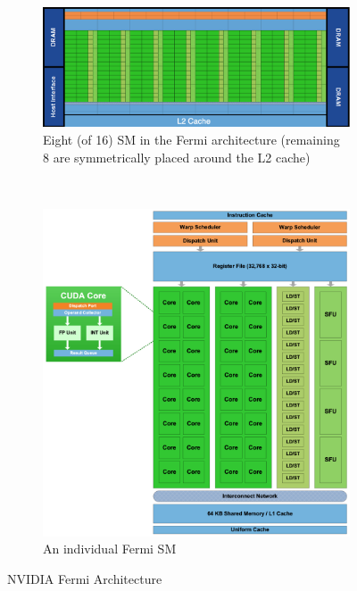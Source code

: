 \begin{figure}
    \centering
    \begin{subfigure}{\linewidth}
        \centering
        \includegraphics[width=\linewidth]{figures/fermi_arch.png}
        \caption{Eight (of 16) SM in the Fermi architecture (remaining 8 are symmetrically placed around the L2 cache)}
        \label{fig:top_half_ferm_arch}
    \end{subfigure}
    \\[3ex]
    \begin{subfigure}{\linewidth}
        \centering
        \includegraphics[width=\linewidth]{figures/cuda_cores.png}
        \caption{An individual Fermi SM}
        \label{fig:cuda_cores}
    \end{subfigure}
    \caption{NVIDIA Fermi Architecture~\cite{5751939}}
    \label{fig:fermi_arch}
\end{figure}
